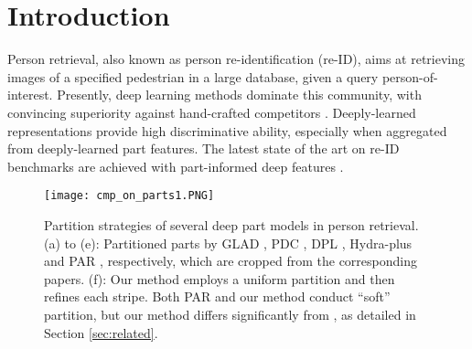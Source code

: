 \documentclass[10pt,twocolumn,letterpaper]{article}
\begin{document}
\section{Introduction}\label{sec:introduction}
Person retrieval, also known as person re-identification (re-ID), aims at retrieving images of a specified pedestrian in a large database, given a query person-of-interest. Presently, deep learning methods dominate this community, with convincing superiority against hand-crafted competitors \cite{DBLP:journals/corr/ZhengYH16}. Deeply-learned representations provide high discriminative ability, especially when aggregated from deeply-learned part features. The latest state of the art on re-ID benchmarks are achieved with part-informed deep features \cite{Yao2017Deep,Su2017Pose,Zhao2017Deeply}.
\begin{figure}[t]
\setlength{\abovecaptionskip}{0cm}  
\setlength{\belowcaptionskip}{-1cm}  
\centering 
\texttt{[image: cmp\_on\_parts1.PNG]}

   \caption{Partition strategies of several deep part models in person retrieval. (a) to (e): Partitioned parts by GLAD \cite{Wei2017GLAD}, PDC \cite{Su2017Pose}, DPL \cite{Yao2017Deep}, Hydra-plus \cite{Liu2017HydraPlus} and PAR \cite{Zhao2017Deeply}, respectively, which are cropped from the corresponding papers. (f): Our method employs a uniform partition and then refines each stripe. Both PAR \cite{Zhao2017Deeply} and our method conduct ``soft'' partition, but our method differs significantly from \cite{Zhao2017Deeply}, as detailed in Section \ref{sec:related}.}
\label{fig:part_cmp}
\end{figure}
\end{document}
